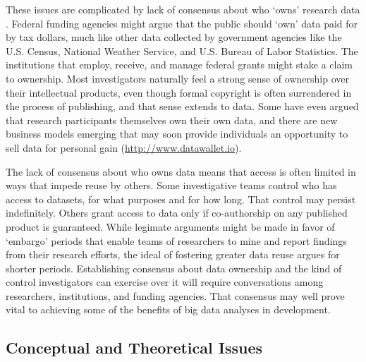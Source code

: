 \documentclass[letterpaper,man,apacite]{apa6}
\begin{document}
These issues are complicated by lack of consensus about who `owns' research data \cite{who_owns_research_data}.
Federal funding agencies might argue that the public should `own' data paid for by tax dollars, much like other data collected by government agencies like the U.S. Census, National Weather Service, and U.S. Bureau of Labor Statistics.
The institutions that employ, receive, and manage federal grants might stake a claim to ownership.
Most investigators naturally feel a strong sense of ownership over their intellectual products, even though formal copyright is often surrendered in the process of publishing, and that sense extends to data.
Some have even argued that research participants themselves own their own data, and there are new business models emerging that may soon provide individuals an opportunity to sell data for personal gain (\url{http://www.datawallet.io}).

The lack of consensus about who owns data means that access is often limited in ways that impede reuse by others.
Some investigative teams control who has access to datasets, for what purposes and for how long.
That control may persist indefinitely.
Others grant access to data only if co-authorship on any published product is guaranteed.
While legimate arguments might be made in favor of `embargo' periods that enable teams of researchers to mine and report findings from their research efforts, the ideal of fostering greater data reuse argues for shorter periods.
Establishing consensus about data ownership and the kind of control investigators can exercise over it will require conversations among researchers, institutions, and funding agencies.
That consensus may well prove vital to achieving some of the benefits of big data analyses in development. 

\subsection{Conceptual and Theoretical Issues}
\end{document}
